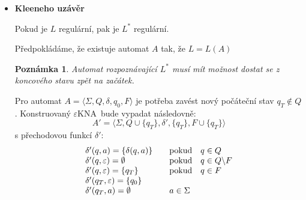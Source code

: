 \documentclass[10pt, a4paper, titlepage]{article}
\theoremstyle{note}
\newtheorem{poznamka}{Poznámka}
\newcommand{\ekna}{$\varepsilon$KNA}		%
\begin{document}
\begin{itemize}
\begin{center}
\begin{VCPicture}{(-5,-2)(5,2)}
\end{VCPicture}
\end{center}

Sestavíme \ekna
$$A= \langle \Sigma,Q_1  \cup Q_2,\delta,\lbrace q_{01} \rbrace,F_2 \rangle$$
s přechodovou funkcí $\delta : (Q_1 \cup Q_2) \times (\Sigma \cup \lbrace \varepsilon \rbrace ) \rightarrow 2^{Q_1 \times Q_2}$
$$
\delta(q,a)=\left\{
\begin{array}{l@{\quad\mbox{}\quad}l}
\lbrace \delta_1(q,a) \rbrace & \text{pokud}\quad q \in Q_1\\
\lbrace \delta_2(q,a) \rbrace & \text{pokud}\quad q \in Q_2\\
\end{array}
\right.
$$
$$
\delta(q,\varepsilon)=\left\{
\begin{array}{l@{\quad\mbox{}\quad}l}
\lbrace q_{02} \rbrace & \text{pokud}\quad q \in F_1\\
\emptyset & \text{pokud}\quad q \notin F_1\\
\end{array}
\right.
$$

\item
\textbf{Kleeneho uzávěr}

Pokud je $L$ regulární, pak je $L^*$ regulární.

Předpokládáme, že existuje automat $A$ tak, že $L = L(A)$
\begin{poznamka}
Automat rozpoznávající $L^*$ musí mít možnost dostat se z koncového stavu zpět na začátek.
\end{poznamka}
Pro automat $A = \langle \Sigma, Q, \delta, q_0, F \rangle$ je potřeba zavést nový počáteční stav $q_T \notin Q$. Konstruovaný \ekna\ bude vypadat následovně:
$$A' = \langle \Sigma, Q \cup \lbrace q_T \rbrace, \delta ', \lbrace q_T \rbrace, F \cup \lbrace q_T \rbrace \rangle$$
s přechodovou funkcí $\delta '$:
$$
\begin{array}{l@{\quad\mbox{}\quad}l}
\delta ' (q,a) = \lbrace \delta (q,a) \rbrace & \text{pokud}\quad q \in Q\\
\delta ' (q,\varepsilon) = \emptyset & \text{pokud}\quad q \in Q \backslash F\\
\delta ' (q,\varepsilon) = \lbrace q_T \rbrace & \text{pokud}\quad q \in F\\
\delta ' (q_T,\varepsilon) = \lbrace q_0 \rbrace & \\
\delta ' (q_T,a) = \emptyset & a \in \Sigma \\

\end{array}
$$
\end{itemize}
\end{document}
